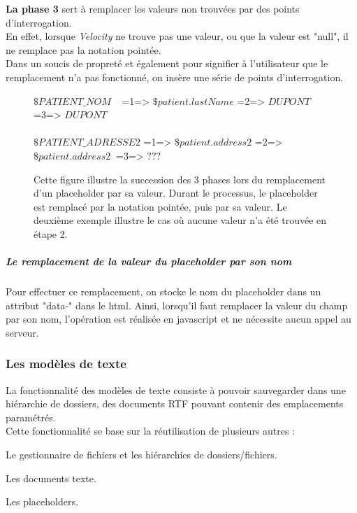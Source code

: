 \textbf{La phase 3} sert à remplacer les valeurs non trouvées par des points d'interrogation.\\
En effet, lorsque \textit{Velocity} ne trouve pas une valeur, ou que la valeur est "null", il ne remplace pas la notation pointée.\\
Dans un soucis de propreté et également pour signifier à l'utilisateur que le remplacement n'a pas fonctionné, on insère une série de points d'interrogation.


\begin{figure}[H]
	\color{darkgray} 
	\centering
$\$PATIENT\_NOM$ $~~$ =1=> $\$patient.lastName$ =2=> $DUPONT$ $~$ =3=> $DUPONT$ $~$\\ $~$\\
  $\$PATIENT\_ADRESSE2$  =1=> $\$patient.address2$ =2=> $\$patient.address2~$ =3=> $???$ 	
	\caption{\color{black} \label{fig:annotations} Cette figure illustre la succession des 3 phases lors du remplacement d'un placeholder par sa valeur. Durant le processus, le placeholder est remplacé par la notation pointée, puis par sa valeur. Le deuxième exemple illustre le cas où aucune valeur n'a été trouvée en étape 2.}
\end{figure}

\subparagraph*{Le remplacement de la valeur du placeholder par son nom}
Pour effectuer ce remplacement, on stocke le nom du placeholder dans un attribut "data-" dans le html. Ainsi, lorsqu'il faut remplacer la valeur du champ par son nom, l'opération est réalisée en javascript et ne nécessite aucun appel au serveur.




\subsubsection{Les modèles de texte}
La fonctionnalité des modèles de texte consiste à pouvoir sauvegarder dans une hiérarchie de dossiers, des documents RTF pouvant contenir des emplacements paramétrés.\\
Cette fonctionnalité se base sur la réutilisation de plusieurs autres :
\begin{sitemize}
\item Le gestionnaire de fichiers et les hiérarchies de dossiers/fichiers.
\item Les documents texte.
\item Les placeholders.
\end{sitemize}

